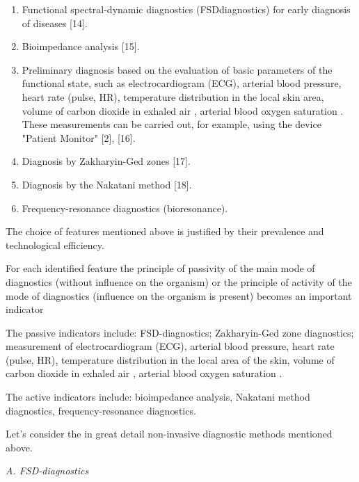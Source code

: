 \documentclass[twocolumn]{scndocument}
\begin{document}
\vspace{-5pt}
\begin{enumerate}
    \setlength{\itemsep}{-3pt} 
    \setlength{\parsep}{-3pt}
    \item  Functional spectral-dynamic diagnostics (FSDdiagnostics) for early diagnosis of diseases [14].
    \item  Bioimpedance analysis [15].
    \item Preliminary diagnosis based on the evaluation of
basic parameters of the functional state, such as
electrocardiogram (ECG), arterial blood pressure,
heart rate (pulse, HR), temperature distribution in
the local skin area, volume of carbon dioxide in
exhaled air \textit{}, arterial blood oxygen saturation
\textit{}. These measurements can be carried out, for
example, using the device "Patient Monitor" [2],
[16].
    \item Diagnosis by Zakharyin-Ged zones [17].
    \item Diagnosis by the Nakatani method [18].
    \item Frequency-resonance diagnostics (bioresonance).
\end{enumerate}
\vspace{-5pt}

The choice of features mentioned above is justified by
their prevalence and technological efficiency.


For each identified feature the principle of passivity
of the main mode of diagnostics (without influence on
the organism) or the principle of activity of the mode
of diagnostics (influence on the organism is present)
becomes an important indicator

The passive indicators include: FSD-diagnostics;
Zakharyin-Ged zone diagnostics; measurement of electrocardiogram (ECG), arterial blood pressure, heart rate
(pulse, HR), temperature distribution in the local area of
the skin, volume of carbon dioxide in exhaled air \textit{},
arterial blood oxygen saturation \textit{}.

The active indicators include: bioimpedance analysis,
Nakatani method diagnostics, frequency-resonance diagnostics.

Let’s consider the in great detail non-invasive diagnostic methods mentioned above.

\begin{flushleft}
\vspace{-3pt}
\textit{A. FSD-diagnostics}
\vspace{-3pt}
\end{flushleft}
\end{document}
